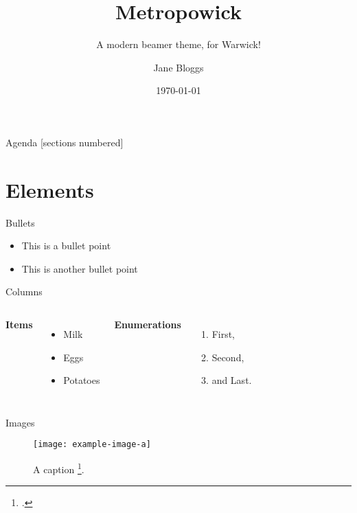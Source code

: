 \documentclass[10pt,aspectratio=169]{beamer}
\title{Metropowick}\subtitle{A modern beamer theme, for Warwick!}
\date{\today}
\author{Jane Bloggs}
\institute{University of Warwick}
\renewcommand{\cite}{\footcite}
\begin{document}
\maketitle

\begin{frame}{Agenda}
    [sections numbered]
    \tableofcontents
\end{frame}

\section{Elements}

\begin{frame}{Bullets}
    \begin{itemize}
        \item This is a bullet point
        \item This is another bullet point
    \end{itemize}
\end{frame}

\begin{frame}{Columns}
    \begin{columns}[T,onlytextwidth]
            \textbf{Items}
            \begin{itemize}
                \item Milk
                \item Eggs
                \item Potatoes
            \end{itemize}

            \textbf{Enumerations}
            \begin{enumerate}
                \item First,
                \item Second,
                \item and Last.
            \end{enumerate}
    \end{columns}
\end{frame}

\begin{frame}{Images}
    \begin{figure}[H]
        \texttt{[image: example-image-a]}
        \caption{A caption \cite{Knuth92}.}
        \label{fig:image}
    \end{figure}
\end{frame}
\end{document}
